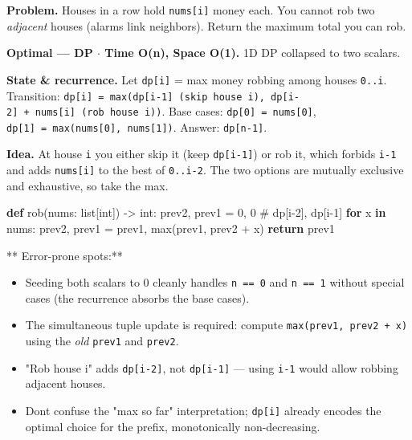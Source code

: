 \documentclass[11pt]{article}
\providecommand{\tightlist}{\setlength{\itemsep}{1pt}\setlength{\parskip}{0pt}}
\newenvironment{Shaded}{\begin{snugshade}}{\end{snugshade}}
\newcommand{\BuiltInTok}[1]{\textcolor[rgb]{0.50,0.55,0.55}{#1}}
\newcommand{\CommentTok}[1]{\textcolor[rgb]{0.48,0.49,0.49}{#1}}
\newcommand{\ControlFlowTok}[1]{\textcolor[rgb]{0.99,0.74,0.29}{\textbf{#1}}}
\newcommand{\DecValTok}[1]{\textcolor[rgb]{0.96,0.45,0.00}{#1}}
\newcommand{\KeywordTok}[1]{\textcolor[rgb]{0.81,0.81,0.76}{\textbf{#1}}}
\newcommand{\NormalTok}[1]{\textcolor[rgb]{0.81,0.81,0.76}{#1}}
\newcommand{\OperatorTok}[1]{\textcolor[rgb]{0.81,0.81,0.76}{#1}}
\begin{document}
\textbf{Problem.} Houses in a row hold \texttt{nums{[}i{]}} money each. You cannot rob two \emph{adjacent} houses (alarms link neighbors). Return the maximum total you can rob.

\textbf{Optimal --- DP \(\cdot\) Time O(n), Space O(1).} 1D DP collapsed to two scalars.

\textbf{State \& recurrence.} Let \texttt{dp{[}i{]}} = max money robbing among houses \texttt{0..i}. Transition: \texttt{dp{[}i{]}\ =\ max(dp{[}i-1{]}\ (skip\ house\ i),\ dp{[}i-2{]}\ +\ nums{[}i{]}\ (rob\ house\ i))}. Base cases: \texttt{dp{[}0{]}\ =\ nums{[}0{]}}, \texttt{dp{[}1{]}\ =\ max(nums{[}0{]},\ nums{[}1{]})}. Answer: \texttt{dp{[}n-1{]}}.

\textbf{Idea.} At house \texttt{i} you either skip it (keep \texttt{dp{[}i-1{]}}) or rob it, which forbids \texttt{i-1} and adds \texttt{nums{[}i{]}} to the best of \texttt{0..i-2}. The two options are mutually exclusive and exhaustive, so take the max.


\begin{Shaded}
\begin{Highlighting}[]
\KeywordTok{def}\NormalTok{ rob(nums: }\BuiltInTok{list}\NormalTok{[}\BuiltInTok{int}\NormalTok{]) }\OperatorTok{{-}\textgreater{}} \BuiltInTok{int}\NormalTok{:}
\NormalTok{    prev2, prev1 }\OperatorTok{=} \DecValTok{0}\NormalTok{, }\DecValTok{0}            \CommentTok{\# dp[i{-}2], dp[i{-}1]}
    \ControlFlowTok{for}\NormalTok{ x }\KeywordTok{in}\NormalTok{ nums:}
\NormalTok{        prev2, prev1 }\OperatorTok{=}\NormalTok{ prev1, }\BuiltInTok{max}\NormalTok{(prev1, prev2 }\OperatorTok{+}\NormalTok{ x)}
    \ControlFlowTok{return}\NormalTok{ prev1}
\end{Highlighting}
\end{Shaded}

** Error-prone spots:**

\begin{itemize}
\tightlist
\item
  Seeding both scalars to 0 cleanly handles \texttt{n\ ==\ 0} and \texttt{n\ ==\ 1} without special cases (the recurrence absorbs the base cases).
\item
  The simultaneous tuple update is required: compute \texttt{max(prev1,\ prev2\ +\ x)} using the \emph{old} \texttt{prev1} and \texttt{prev2}.
\item
  "Rob house i" adds \texttt{dp{[}i-2{]}}, not \texttt{dp{[}i-1{]}} --- using \texttt{i-1} would allow robbing adjacent houses.
\item
  Don\textquotesingle t confuse the "max so far" interpretation; \texttt{dp{[}i{]}} already encodes the optimal choice for the prefix, monotonically non-decreasing.
\end{itemize}
\end{document}
